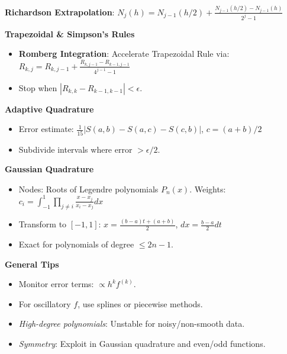 \documentclass{article}
\begin{document}
\begin{minipage}[t]{0.49\textwidth}
    \textbf{Richardson Extrapolation}:  
        \( N_j(h) = N_{j-1}(h/2) + \frac{N_{j-1}(h/2)-N_{j-1}(h)}{2^{j}-1} \)

\textbf{Trapezoidal \& Simpson's Rules}
\begin{itemize}
    \item \textbf{Romberg Integration}: Accelerate Trapezoidal Rule via:
        $R_{k,j} = R_{k,j-1} + \frac{R_{k,j-1}-R_{k-1,j-1}}{4^{j-1}-1}$
    \item Stop when $|R_{k,k}-R_{k-1,k-1}| < \epsilon$.
\end{itemize}

\textbf{Adaptive Quadrature}
\begin{itemize}
    \item Error estimate: \( \frac{1}{15}|S(a,b)-S(a,c)-S(c,b)| \), \( c=(a+b)/2 \)
    \item Subdivide intervals where error \( > \epsilon/2 \).
\end{itemize}

\textbf{Gaussian Quadrature}
\begin{itemize}
    \item Nodes: Roots of Legendre polynomials \( P_n(x) \). Weights: \( c_i = \int_{-1}^1 \prod_{j\neq i}\frac{x-x_j}{x_i-x_j}dx \)
    \item Transform to \([-1,1]\): \( x = \frac{(b-a)t + (a+b)}{2} \), \( dx = \frac{b-a}{2}dt \)
    \item Exact for polynomials of degree \( \leq 2n-1 \).
\end{itemize}

\textbf{General Tips}
\begin{itemize}
    \item Monitor error terms: \( \propto h^kf^{(k)} \).  
    \item For oscillatory \( f \), use splines or piecewise methods.  
    \item \textit{High-degree polynomials}: Unstable for noisy/non-smooth data.  
    \item \textit{Symmetry}: Exploit in Gaussian quadrature and even/odd functions.
\end{itemize}


\end{minipage}
\end{document}

